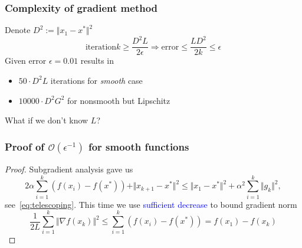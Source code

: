 \documentclass{beamer}
\begin{document}
\begin{frame}
  \frametitle{Complexity of gradient method}
  Denote $D^2 := \Vert x_1- x^* \Vert^2$
  \begin{equation}
    \text{iteration} k \ge \frac{D^2 L}{2 \epsilon} \Rightarrow \text{error} \le \frac{L D^2}{2 k} \le \epsilon
  \end{equation}
  Given error $\epsilon=0.01$ results in
  \begin{itemize}
    \item $50 \cdot D^2 L$ iterations for \textit{smooth} case
      \item $10 000 \cdot D^2 G^2$ for nonsmooth but Lipschitz
  \end{itemize}

  What if we don't know $L$?
\end{frame}

\begin{frame}
  \frametitle{Proof of $\mathcal{O}(\epsilon^{-1})$ for smooth functions}
  \begin{proof}
    Subgradient analysis gave us
    \begin{equation}
      2 \alpha \sum_{i=1}^{k} (f(x_i) - f(x^*)) + \Vert x_{k+1} - x^* \Vert^2 \le \Vert x_1-x^* \Vert^2 +  \alpha^2 \sum_{i=1}^{k}  \Vert g_k \Vert^2,
    \end{equation}
    see~\eqref{eq:telescoping}. This time we use \textcolor{blue}{sufficient decrease} to bound gradient norm
    \begin{equation}
      \frac{1}{2 L} \sum_{i=1}^{k} \Vert \nabla f(x_k) \Vert^2 \le \sum_{i=1}^{k} (f(x_i) - f(x^*)) = f(x_1) - f(x_k)
    \end{equation}
  \end{proof}

\end{frame}
\end{document}
